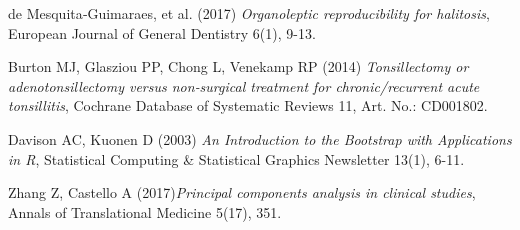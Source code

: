 \documentclass[12pt,a4paper,notitlepage]{report}
\begin{document}
\begin{thebibliography}{26}
 de Mesquita‑Guimaraes, et al. (2017) \emph{Organoleptic reproducibility for halitosis}, European Journal of General Dentistry 6(1), 9-13.

 Burton MJ, Glasziou PP, Chong L, Venekamp RP (2014) \emph{Tonsillectomy or adenotonsillectomy versus non‐surgical treatment for chronic/recurrent acute tonsillitis}, Cochrane Database of Systematic Reviews 11, Art. No.: CD001802.  

  Davison AC, Kuonen D (2003) \emph{An Introduction to the Bootstrap with Applications in R}, Statistical Computing \& Statistical Graphics Newsletter 13(1), 6-11.

 Zhang Z, Castello A (2017)\emph{Principal components analysis in clinical studies}, Annals of Translational Medicine 5(17), 351.

\end{thebibliography}

\listoffigures
{}

\listoftables
{}
\end{document}
